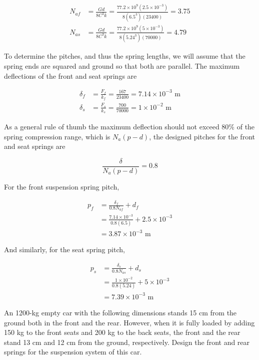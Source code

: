 \documentclass[a4paper,openany,nobib]{tufte-book}
\begin{document}
{{$$\begin{aligned}
    N_{af} &= \frac{Gd}{8C^3k} = \frac{77.2 \times 10^9(2.5 \times 10^{-3})}{8(6.5^3)(23400)} = 3.75 \\
    N_{as} &= \frac{Gd}{8C^3k} = \frac{77.2 \times 10^9(5 \times 10^{-3})}{8(5.24^3)(70000)} = 4.79
  \end{aligned}$$

To determine the pitches, and thus the spring lengths, we will assume
that the spring ends are squared and ground so that both are parallel.
The maximum deflections of the front and seat springs are

$$\begin{aligned}
    \delta_f &= \frac{F_f}{k_f} = \frac{167}{23400} = 7.14 \times 10^{-3} \text{ m} \\
    \delta_s &= \frac{F_s}{k_s} = \frac{700}{70000} = 1 \times 10^{-2}\text{ m}
  \end{aligned}$$

As a general rule of thumb the maximum deflection should not exceed 80\%
of the spring compression range, which is \(N_a(p - d)\), the designed
pitches for the front and seat springs are

$$\frac{\delta}{N_a(p - d)} = 0.8$$

For the front suspension spring pitch,

$$\begin{aligned}
    p_f &= \frac{\delta _f}{0.8N_{af}} + d_f \\ 
          &= \frac{7.14 \times 10^{-3}}{0.8(6.5)} + 2.5 \times 10^{-3} \\ 
          &= 3.87 \times 10^{-3} \text{ m}
  \end{aligned}$$

And similarly, for the seat spring pitch,

$$\begin{aligned}
    p_s &= \frac{\delta _s}{0.8N_{as}} + d_s \\ 
          &= \frac{1 \times 10^{-2}}{0.8(5.24)} + 5 \times 10^{-3} \\ 
          &= 7.39 \times 10^{-3}\text{ m}
  \end{aligned}$$

An 1200-kg empty car with the following dimensions stands 15 cm from the
ground both in the front and the rear. However, when it is fully loaded
by adding 150 kg to the front seats and 200 kg to the back seats, the
front and the rear stand 13 cm and 12 cm from the ground, respectively.
Design the front and rear springs for the suspension system of this car.

}}
\end{document}

